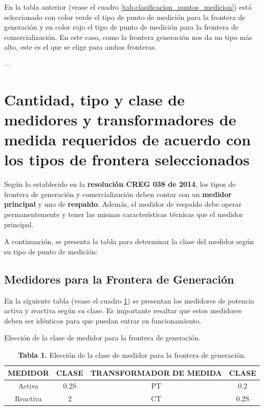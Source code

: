 En la tabla anterior (vease el cuadro \ref{tab:clasificacion_puntos_medicion}) está seleccionado con color verde el tipo de punto de medición para la frontera de generación y en color rojo el tipo de punto de medición para la frontera de comercialización. En este caso, como la frontera generación nos da un tipo más alto, este es el que se elige para ambas fronteras.

---
\section{Cantidad, tipo y clase de medidores y transformadores de medida requeridos de acuerdo con los tipos de frontera seleccionados}

Según lo establecido en la \textbf{resolución CREG 038 de 2014}, los tipos de frontera de generación y comercialización deben contar con un \textbf{medidor principal} y uno de \textbf{respaldo}. Además, el medidor de respaldo debe operar permanentemente y tener las mismas características técnicas que el medidor principal.

A continuación, se presenta la tabla para determinar la clase del medidor según su tipo de punto de medición:



\subsection{Medidores para la Frontera de Generación}
En la siguiente tabla (vease el cuadro \ref{tab:clase_medidor_generacion}) se presentan los medidores de potencia activa y reactiva según su clase. Es importante resaltar que estos medidores deben ser idénticos para que puedan entrar en funcionamiento.

\begin{table}[H]
    \centering
    \caption{Elección de la clase de medidor para la frontera de generación.}
    \label{tab:clase_medidor_generacion}
    \begin{tabular}{cccc}
        \toprule
        \textbf{MEDIDOR} & \textbf{CLASE} & \textbf{TRANSFORMADOR DE MEDIDA} & \textbf{CLASE} \\
        \midrule
        Activa & 0.2S & PT & 0.2 \\
        Reactiva & 2 & CT & 0.2S \\
        \bottomrule
    \end{tabular}
    \caption*{\textbf{Tabla 1.} Elección de la clase de medidor para la frontera de generación.}
\end{table}


